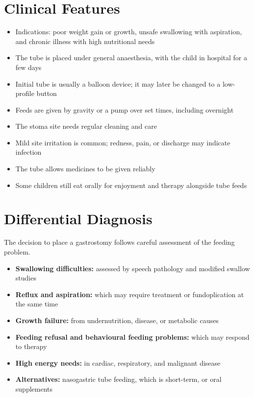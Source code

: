 \section*{Clinical Features}
\begin{itemize}
    \item Indications: poor weight gain or growth, unsafe swallowing with aspiration, and chronic illness with high nutritional needs
    \item The tube is placed under general anaesthesia, with the child in hospital for a few days
    \item Initial tube is usually a balloon device; it may later be changed to a low-profile button
    \item Feeds are given by gravity or a pump over set times, including overnight
    \item The stoma site needs regular cleaning and care
    \item Mild site irritation is common; redness, pain, or discharge may indicate infection
    \item The tube allows medicines to be given reliably
    \item Some children still eat orally for enjoyment and therapy alongside tube feeds
\end{itemize}

\section*{Differential Diagnosis}
The decision to place a gastrostomy follows careful assessment of the feeding problem.
\begin{itemize}
    \item \textbf{Swallowing difficulties:} assessed by speech pathology and modified swallow studies
    \item \textbf{Reflux and aspiration:} which may require treatment or fundoplication at the same time
    \item \textbf{Growth failure:} from undernutrition, disease, or metabolic causes
    \item \textbf{Feeding refusal and behavioural feeding problems:} which may respond to therapy
    \item \textbf{High energy needs:} in cardiac, respiratory, and malignant disease
    \item \textbf{Alternatives:} nasogastric tube feeding, which is short-term, or oral supplements
\end{itemize}

